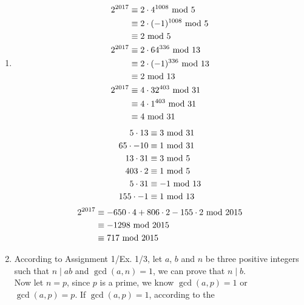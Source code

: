 \documentclass{article}
\renewcommand{\mod}{{\rm\ mod\ }}
\begin{document}
\begin{enumerate}
\item
\begin{align*}
2^{2017}&\equiv 2\cdot 4^{1008}\mod 5\\
&\equiv 2\cdot (-1)^{1008}\mod 5\\
&\equiv 2\mod 5\\
2^{2017}&\equiv 2\cdot 64^{336}\mod 13\\
&\equiv 2\cdot (-1)^{336}\mod 13\\
&\equiv 2\mod 13\\
2^{2017}&\equiv 4\cdot 32^{403}\mod 31\\
&\equiv 4\cdot 1^{403}\mod 31\\
&\equiv 4\mod 31
\end{align*}
\begin{align*}
5\cdot13&\equiv 3\mod 31\\
65\cdot-10&\equiv 1\mod 31\\
13\cdot31&\equiv 3\mod 5\\
403\cdot2&\equiv 1\mod 5\\
5\cdot31&\equiv -1\mod 13\\
155\cdot-1&\equiv 1\mod 13
\end{align*}
\begin{align*}
2^{2017}&\equiv -650\cdot4+806\cdot2-155\cdot2\mod 2015\\
&\equiv -1298\mod 2015\\
&\equiv 717\mod 2015\\
\end{align*}

\item
According to Assignment 1/Ex. 1/3, let $a$, $b$ and $n$ be three positive integers such that $n\mid ab$ and $\gcd(a,n)=1$, we can prove that $n\mid b$.\\
Now let $n=p$, since $p$ is a prime, we know $\gcd(a,p)=1$ or $\gcd(a,p)=p$. If $\gcd(a,p)=1$, according to the 


\end{enumerate}
\end{document}
